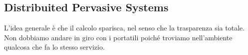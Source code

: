 \subsection{Distribuited Pervasive Systems}
L'idea generale è che il calcolo sparisca, nel senso che la trasparenza sia totale. Non dobbiamo andare in giro con i portatili poiché troviamo nell'ambiente qualcosa che fa lo stesso servizio.\\

